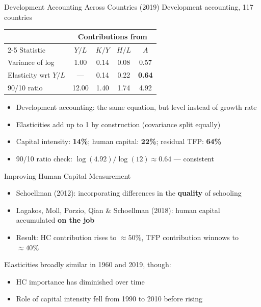 \documentclass[blue]{beamer}
\begin{document}
\begin{frame}{Development Accounting Across Countries (2019)}
	Development accounting, 117 countries
		\vspace{-5pt}
	\begin{table}
		\centering
		\begin{tabular}{lcccc}
			\toprule
			& \multicolumn{4}{c}{Contributions from} \\
			\cmidrule(lr){2-5}
			Statistic & $Y/L$ & $K/Y$ & $H/L$ & $A$ \\
			\midrule
			Variance of log & 1.00 & 0.14 & 0.08 & 0.57 \\
			Elasticity wrt $Y/L$ & --- & 0.14 & 0.22 & \textbf{0.64} \\
			90/10 ratio & 12.00 & 1.40 & 1.74 & 4.92 \\
			\bottomrule
		\end{tabular}
	\end{table}

	\begin{itemize}
		\item Development accounting: the same equation, but level instead of growth rate
		\item Elasticities add up to 1 by construction (covariance split equally)
		\item Capital intensity:  \textbf{14\%}; human capital: \textbf{22\%}; residual TFP: \textbf{64\%}
		\item 90/10 ratio check: $\log(4.92)/\log(12) \approx 0.64$ --- consistent
	\end{itemize}
\end{frame}


\begin{frame}{Improving Human Capital Measurement}
	\begin{itemize}
		\item Schoellman (2012): incorporating differences in the \textbf{quality} of schooling
		\item Lagakos, Moll, Porzio, Qian \& Schoellman (2018): human capital accumulated \textbf{on the job}
		\item Result: HC contribution rises to $\approx 50\%$, TFP contribution winnows to $\approx 40\%$
	\end{itemize}
	
	\bigskip
Elasticities broadly similar in 1960 and 2019, though:
	\begin{itemize}
		\item HC importance has diminished over time
		\item Role of capital intensity fell from 1990 to 2010 before rising
	\end{itemize}
\end{frame}
\end{document}
